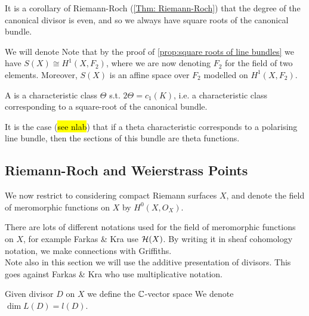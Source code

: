 \documentclass{article}
\begin{document}
\begin{remark}
	It is a corollary of Riemann-Roch (\ref{Thm: Riemann-Roch}) that the degree of the canonical divisor is even, and so we always have square roots of the canonical bundle. 
\end{remark}
\begin{notation}
	We will denote
Note that by the proof of \ref{prop:square roots of line bundles} we have $S(X) \cong H^1(X,F_2)$, where we are now denoting $F_2$ for the field of two elements. Moreover, $S(X)$ is an affine space over $F_2$ modelled on $H^1(X,F_2)$. 
\end{notation}

\begin{definition}
	A  is a characteristic class $\Theta$ s.t. $2\Theta = c_1(K)$, i.e. a characteristic class corresponding to a square-root of the canonical bundle. 
\end{definition}

\begin{remark}
	It is the case (\hl{see nlab}) that if a theta characteristic corresponds to a polarising line bundle, then the sections of this bundle are theta functions. 
\end{remark}
\subsection{Riemann-Roch and Weierstrass Points}
We now restrict to considering compact Riemann surfaces $X$, and denote the field of meromorphic functions on $X$ by $H^0(X,O_X)$.
\begin{remark}
	There are lots of different notations used for the field of meromorphic functions on $X$, for example Farkas \& Kra use $\mathcal{H}(X)$. By writing it in sheaf cohomology notation, we make connections with Griffiths. \\
	Note also in this section we will use the additive presentation of divisors. This goes against Farkas \& Kra who use multiplicative notation.
\end{remark}

\begin{definition}\label{def: L(D) and l(D)}
	Given divisor $D$ on $X$ we define the $\mathbb{C}$-vector space 
	We denote $\dim L(D) = l(D)$.
\end{definition}
\end{document}
